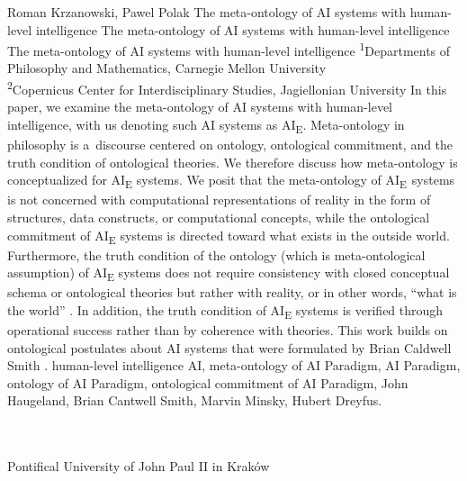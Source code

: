 \begin{artengenv2auth}{Roman Krzanowski, Pawel Polak}
	{The meta-ontology of AI systems with human-level intelligence}
	{The meta-ontology of AI systems with human-level intelligence}
	{The meta-ontology of AI systems with human-level intelligence}
	{\textsuperscript{1}Departments of Philosophy and Mathematics, Carnegie Mellon University\\
		\textsuperscript{2}Copernicus Center for Interdisciplinary Studies, Jagiellonian University}
	{\label{krzanowpolak_start}In this paper, we examine the meta-ontology of AI systems with human-level intelligence, with us denoting such AI systems as AI\textsubscript{E}. Meta-ontology in philosophy is a~discourse centered on ontology, ontological commitment, and the truth condition of ontological theories. We therefore discuss how meta-ontology is conceptualized for AI\textsubscript{E} systems. We posit that the meta-ontology of AI\textsubscript{E~}systems is not concerned with computational representations of reality in the form of structures, data constructs, or computational concepts, while the ontological commitment of AI\textsubscript{E} systems is directed toward what exists in the outside world. Furthermore, the truth condition of the ontology (which is meta-ontological assumption) of AI\textsubscript{E} systems does not require consistency with closed conceptual schema or ontological theories but rather with reality, or in other words, ``what is the world''
	\parencite[][p.57]{smith_promise_2019}. %
	 In addition, the truth condition of AI\textsubscript{E} systems is verified through operational success rather than by coherence with theories. This work builds on ontological postulates about AI systems that were formulated by Brian Caldwell Smith 
	\parencite*[][]{smith_promise_2019}.%
	}
	{human-level intelligence AI, meta-ontology of AI Paradigm, AI Paradigm, ontology of AI Paradigm, ontological commitment of AI Paradigm, John Haugeland, Brian Cantwell Smith, Marvin Minsky, Hubert Dreyfus.}
	{%
		{\flushright{}\\\\\subsubsectit\small{Pontifical University of John Paul II in Kraków}\par}%
	}




\end{artengenv2auth}
